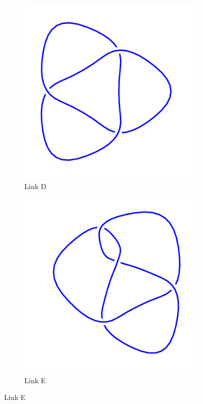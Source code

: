 \documentclass[12pt,letterpaper]{article}
\theoremstyle{definition}
\begin{document}
\begin{figure}[h!]
    \begin{subfigure}{.4\textwidth}
        \centering
        \includegraphics[width=\textwidth]{knotpics/3_1mirror.png}
        \caption{Link D}
    \end{subfigure}
    \hspace{.5cm}
    \begin{subfigure}{.4\textwidth}
        \centering
        \includegraphics[width=\textwidth]{knotpics/4_1.png}
        \caption{Link E}
    \end{subfigure}
    

\end{figure}
\end{document}
